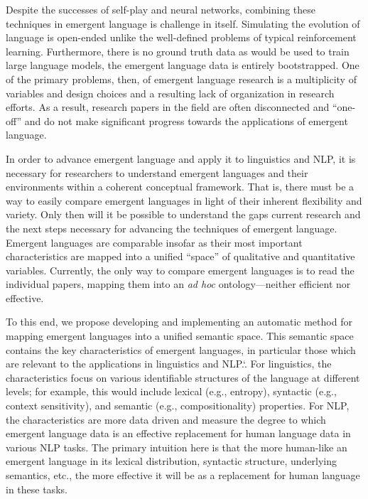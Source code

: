 Despite the successes of self-play and neural networks, combining these techniques in emergent language is challenge in itself.
Simulating the evolution of language is open-ended unlike the well-defined problems of typical reinforcement learning.
Furthermore, there is no ground truth data as would be used to train large language models, the emergent language data is entirely bootstrapped.
One of the primary problems, then, of emergent language research is a multiplicity of variables and design choices  and a resulting lack of organization in research efforts.
As a result, research papers in the field are often disconnected and ``one-off'' and do not make significant progress towards the applications of emergent language.

In order to advance emergent language and apply it to linguistics and NLP, it is necessary for researchers to understand emergent languages and their environments within a coherent conceptual framework.
That is, there must be a way to easily compare emergent languages in light of their inherent flexibility and variety.
Only then will it be possible to understand the gaps current research and the next steps necessary for advancing the techniques of emergent language.
Emergent languages are comparable insofar as their most important characteristics are mapped into a unified ``space'' of qualitative and quantitative variables.
Currently, the only way to compare emergent languages is to read the individual papers, mapping them into an \emph{ad hoc} ontology---neither efficient nor effective.

To this end, we propose developing and implementing an automatic method for mapping emergent languages  into a unified semantic space.
This semantic space contains the key characteristics of emergent languages, in particular those which are relevant to the applications in linguistics and NLP.\spacefactor\sfcode`.{}
For linguistics, the characteristics focus on various identifiable structures of the language at different levels; for example, this would include lexical (e.g., entropy), syntactic (e.g., context sensitivity), and semantic (e.g., compositionality) properties.
For NLP, the characteristics are more data driven and measure the degree to which emergent language data is an effective replacement for human language data in various NLP tasks.
The primary intuition here is that the more human-like an emergent language in its lexical distribution, syntactic structure, underlying semantics, etc., the more effective it will be as a replacement for human language in these tasks.

